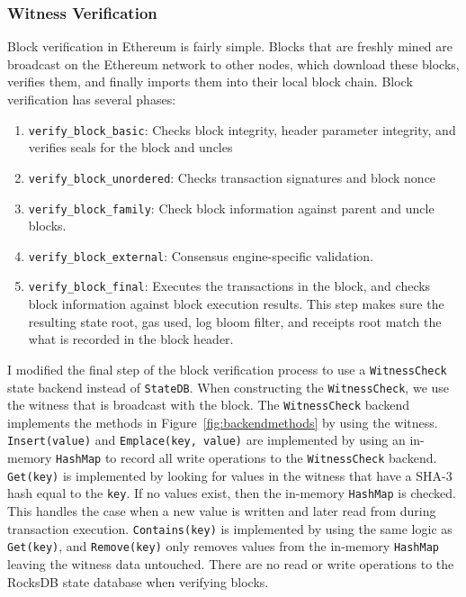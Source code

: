 \documentclass[12pt]{article}
\begin{document}
\subsubsection{Witness Verification}

Block verification in Ethereum is fairly simple. Blocks that are freshly mined are broadcast on the Ethereum network to other nodes, which download these blocks, verifies them, and finally imports them into their local block chain. Block verification has several phases:
\begin{enumerate}
  \item \texttt{verify\_block\_basic}: Checks block integrity, header parameter integrity, and verifies seals for the block and uncles
  \item \texttt{verify\_block\_unordered}: Checks transaction signatures and block nonce
  \item \texttt{verify\_block\_family}: Check block information against parent and uncle blocks.
  \item \texttt{verify\_block\_external}: Consensus engine-specific validation.
  \item \texttt{verify\_block\_final}: Executes the transactions in the block, and checks block information against block execution results. This step makes sure the resulting state root, gas used, log bloom filter, and receipts root match the what is recorded in the block header.
\end{enumerate}

I modified the final step of the block verification process to use a \texttt{WitnessCheck} state backend instead of \texttt{StateDB}. When constructing the \texttt{WitnessCheck}, we use the witness that is broadcast with the block. The \texttt{WitnessCheck} backend implements the methods in Figure~\ref{fig:backendmethods} by using the witness. \texttt{Insert(value)} and \texttt{Emplace(key, value)} are implemented by using an in-memory \texttt{HashMap} to record all write operations to the \texttt{WitnessCheck} backend. \texttt{Get(key)} is implemented by looking for values in the witness that have a SHA-3 hash equal to the \texttt{key}. If no values exist, then the in-memory \texttt{HashMap} is checked. This handles the case when a new value is written and later read from during transaction execution. \texttt{Contains(key)} is implemented by using the same logic as \texttt{Get(key)}, and \texttt{Remove(key)} only removes values from the in-memory \texttt{HashMap} leaving the witness data untouched. There are no read or write operations to the RocksDB state database when verifying blocks.
\end{document}
